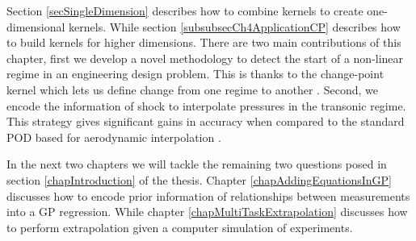 Section \ref{secSingleDimension} describes how to combine kernels to create one-dimensional kernels. While section \ref{subsubsecCh4ApplicationCP} describes how to build kernels for higher dimensions. There are two main contributions of this chapter, first we develop a novel methodology to detect the start of a non-linear regime in an engineering design problem. This is thanks to the change-point kernel which lets us define change from one regime to another \cite{chiplunkar:hal-01555401}. Second, we encode the information of shock to interpolate pressures in the transonic regime. This strategy gives significant gains in accuracy when compared to the standard POD based for aerodynamic interpolation \cite{oatao18004}. 

In the next two chapters we will tackle the remaining two questions posed in section \ref{chapIntroduction} of the thesis. Chapter \ref{chapAddingEquationsInGP} discusses how to encode prior information of relationships between measurements into a GP regression. While chapter \ref{chapMultiTaskExtrapolation} discusses how to perform extrapolation given a computer simulation of experiments. 
